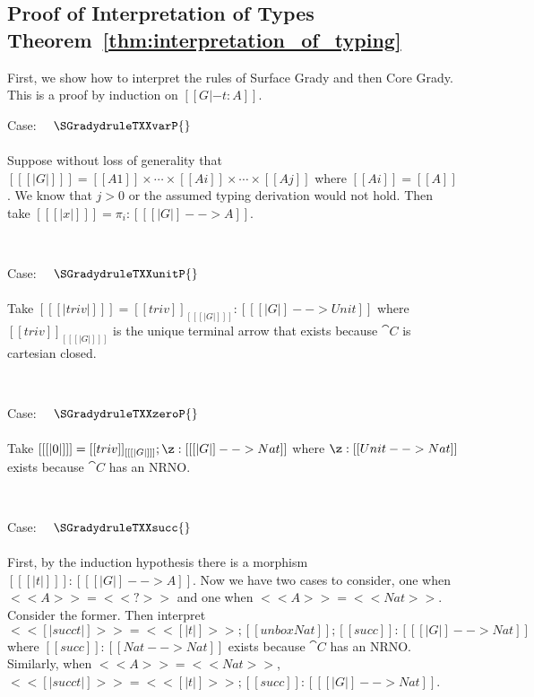 \subsection{Proof of Interpretation of Types Theorem~\ref{thm:interpretation_of_typing}}
\label{subsec:proof_of_interpretation_of_types}
First, we show how to interpret the rules of Surface Grady and then Core Grady.
This is a proof by induction on $[[G |- t : A]]$.
\begin{description}
\item Case: $\quad \SGradydruleTXXvarP{}$\\
    \\
    \noindent
    Suppose without loss of generality that $[[ [| G |] ]] = [[A1]]
    \times \cdots \times [[Ai]] \times \cdots \times [[Aj]]$ where
    $[[Ai]] = [[A]]$.  We know that $j > 0$ or the assumed typing
    derivation would not hold.  Then take
    $[[ [| x |] ]] = \pi_i : [[ [| G |] --> A]]$.

    \ \\
  \item Case: $\quad \SGradydruleTXXunitP{}$\\
    \\
    \noindent     
    Take $[[ [| triv |] ]] = [[triv]]_{[[ [| G |] ]]} : [[ [| G |] --> Unit ]]$ where $[[triv]]_{[[ [| G |] ]]}$
    is the unique terminal arrow that exists because $\cat{C}$ is cartesian closed.

    \ \\
  \item Case: $\quad \SGradydruleTXXzeroP{}$\\
    \\
    \noindent
    Take $[[ [| 0 |] ]] = [[triv]]_{[[ [| G |] ]]};\z : [[ [| G |] --> Nat]]$
    where $\z : [[Unit --> Nat]]$ exists because $\cat{C}$
    has an NRNO.

    \ \\
  \item Case: $\quad \SGradydruleTXXsucc{}$\\
    \\
    \noindent
    First, by the induction hypothesis there is a morphism $[[ [| t |] ]] : [[ [| G |] --> A]]$.
    Now we have two cases to consider, one when $<<A>> = <<?>>$ and one when $<<A>> = <<Nat>>$.
    Consider the former.  Then interpret
    $<< [| succ t |] >> = << [| t |] >>;[[ unbox Nat ]];[[succ]] : [[ [| G |] --> Nat]]$ where
    $[[succ]] : [[Nat --> Nat]]$ exists because $\cat{C}$ has an NRNO.  Similarly,
    when $<<A>> = <<Nat>>$, 
    $<< [| succ t |] >> = << [| t |] >>;[[succ]] : [[ [| G |] --> Nat]]$.


\end{description}
